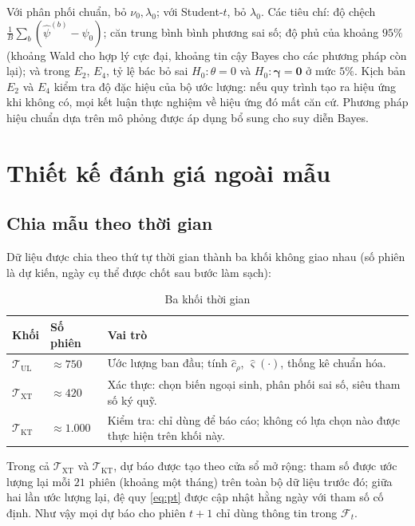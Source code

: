 \documentclass[12pt,a4paper]{article}
\theoremstyle{definition}
\theoremstyle{remark}
\newcommand{\Fcal}{\mathcal{F}}
\newcommand{\bgamma}{\boldsymbol{\gamma}}
\begin{document}
Với phân phối chuẩn, bỏ $\nu_0,\lambda_0$; với Student-$t$, bỏ $\lambda_0$. Các tiêu chí: độ chệch $\frac1B\sum_b(\hat\psi^{(b)}-\psi_0)$; căn trung bình bình phương sai số; độ phủ của khoảng $95\%$ (khoảng Wald cho hợp lý cực đại, khoảng tin cậy Bayes cho các phương pháp còn lại); và trong $E_2$, $E_4$, tỷ lệ bác bỏ sai $H_0:\theta=0$ và $H_0:\bgamma=\mathbf 0$ ở mức $5\%$. Kịch bản $E_2$ và $E_4$ kiểm tra độ đặc hiệu của bộ ước lượng: nếu quy trình tạo ra hiệu ứng khi không có, mọi kết luận thực nghiệm về hiệu ứng đó mất căn cứ. Phương pháp hiệu chuẩn dựa trên mô phỏng \cite{talts2018} được áp dụng bổ sung cho suy diễn Bayes.

\section{Thiết kế đánh giá ngoài mẫu}\label{sec:danhgia}

\subsection{Chia mẫu theo thời gian}\label{sec:chiamau}

Dữ liệu được chia theo thứ tự thời gian thành ba khối không giao nhau (số phiên là dự kiến, ngày cụ thể được chốt sau bước làm sạch):

\begin{table}[h]
\centering
\caption{Ba khối thời gian}\label{tab:khoi}
\begin{tabular}{@{}llp{8cm}@{}}
\toprule
\textbf{Khối} & \textbf{Số phiên} & \textbf{Vai trò} \\
\midrule
$\mathcal T_{\mathrm{UL}}$ & $\approx 750$ & Ước lượng ban đầu; tính $\hat c_\rho$, $\hat\varsigma(\cdot)$, thống kê chuẩn hóa. \\
$\mathcal T_{\mathrm{XT}}$ & $\approx 420$ & Xác thực: chọn biến ngoại sinh, phân phối sai số, siêu tham số ký quỹ. \\
$\mathcal T_{\mathrm{KT}}$ & $\approx 1.000$ & Kiểm tra: chỉ dùng để báo cáo; không có lựa chọn nào được thực hiện trên khối này. \\
\bottomrule
\end{tabular}
\end{table}

Trong cả $\mathcal T_{\mathrm{XT}}$ và $\mathcal T_{\mathrm{KT}}$, dự báo được tạo theo cửa sổ mở rộng: tham số được ước lượng lại mỗi $21$ phiên (khoảng một tháng) trên toàn bộ dữ liệu trước đó; giữa hai lần ước lượng lại, đệ quy \eqref{eq:pt} được cập nhật hằng ngày với tham số cố định. Như vậy mọi dự báo cho phiên $t+1$ chỉ dùng thông tin trong $\Fcal_t$.
\end{document}
